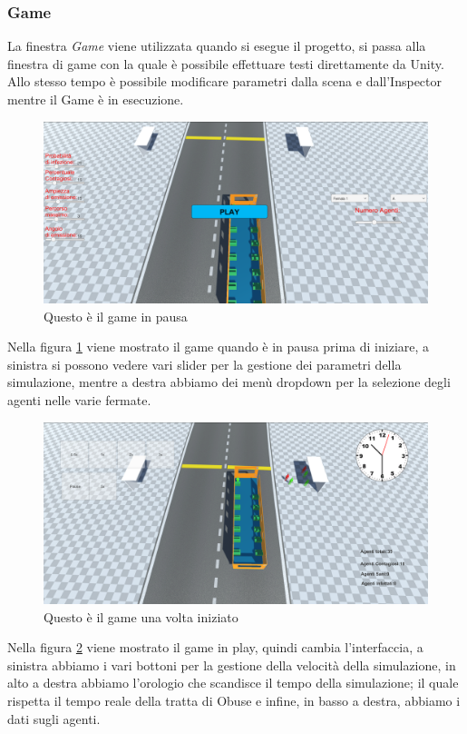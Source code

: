 \documentclass[12pt, openany]{book}
\begin{document}
	\subsubsection{Game}
		La finestra \emph{Game} viene utilizzata quando si esegue il progetto, si passa alla finestra di game con la quale è possibile effettuare testi direttamente da Unity. Allo stesso tempo è possibile modificare parametri dalla scena e dall'Inspector mentre il Game è in esecuzione.
		\begin{figure}[H]
			\centering
			\includegraphics[width=1\linewidth]{"Immagini/PausedGame.png"}
			\caption{Questo è il game in pausa}
			\label{fig:PausedGame}
		\end{figure}
	Nella figura \ref{fig:PausedGame} viene mostrato il game quando è in pausa prima di iniziare, a sinistra si possono vedere vari slider per la gestione dei parametri della simulazione, mentre a destra abbiamo dei menù dropdown per la selezione degli agenti nelle varie fermate.
	\begin{figure}[H]
		\centering
		\includegraphics[width=1\linewidth]{"Immagini/PlayingGame.png"}
		\caption{Questo è il game una volta iniziato}
		\label{fig:PlayingGame}
	\end{figure}
	Nella figura \ref{fig:PlayingGame} viene mostrato il game in play, quindi cambia l'interfaccia, a sinistra abbiamo i vari bottoni per la gestione della velocità della simulazione, in alto a destra abbiamo l'orologio che scandisce il tempo della simulazione; il quale rispetta il tempo reale della tratta di Obuse e infine, in basso a destra, abbiamo i dati sugli agenti.
\end{document}
